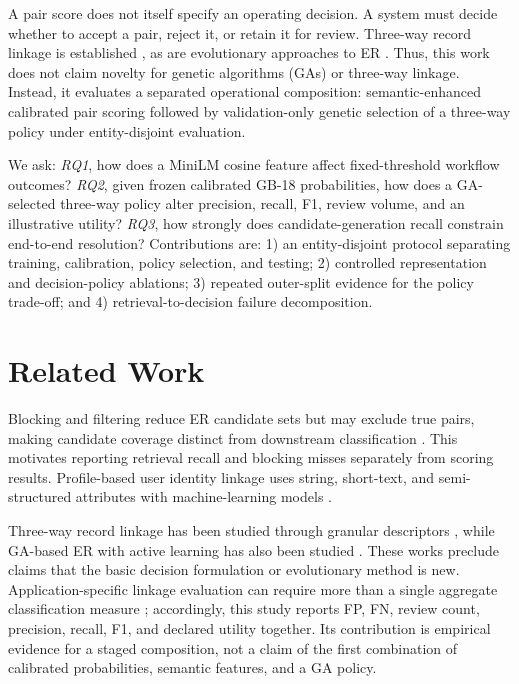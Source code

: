 \documentclass[conference]{IEEEtran}
\begin{document}
A pair score does not itself specify an operating decision. A system must decide whether to accept a pair, reject it, or retain it for review. Three-way record linkage is established \cite{ouyang2019threeway}, as are evolutionary approaches to ER \cite{sun2017gaer}. Thus, this work does not claim novelty for genetic algorithms (GAs) or three-way linkage. Instead, it evaluates a separated operational composition: semantic-enhanced calibrated pair scoring followed by validation-only genetic selection of a three-way policy under entity-disjoint evaluation.

We ask: \textit{RQ1}, how does a MiniLM cosine feature affect fixed-threshold workflow outcomes? \textit{RQ2}, given frozen calibrated GB-18 probabilities, how does a GA-selected three-way policy alter precision, recall, F1, review volume, and an illustrative utility? \textit{RQ3}, how strongly does candidate-generation recall constrain end-to-end resolution? Contributions are: 1) an entity-disjoint protocol separating training, calibration, policy selection, and testing; 2) controlled representation and decision-policy ablations; 3) repeated outer-split evidence for the policy trade-off; and 4) retrieval-to-decision failure decomposition.

\section{Related Work}
Blocking and filtering reduce ER candidate sets but may exclude true pairs, making candidate coverage distinct from downstream classification \cite{papadakis2021blocking,li2020blocking}. This motivates reporting retrieval recall and blocking misses separately from scoring results. Profile-based user identity linkage uses string, short-text, and semi-structured attributes with machine-learning models \cite{yao2023profile}.

Three-way record linkage has been studied through granular descriptors \cite{ouyang2019threeway}, while GA-based ER with active learning has also been studied \cite{sun2017gaer}. These works preclude claims that the basic decision formulation or evolutionary method is new. Application-specific linkage evaluation can require more than a single aggregate classification measure \cite{christen2026consistent}; accordingly, this study reports FP, FN, review count, precision, recall, F1, and declared utility together. Its contribution is empirical evidence for a staged composition, not a claim of the first combination of calibrated probabilities, semantic features, and a GA policy.
\end{document}
